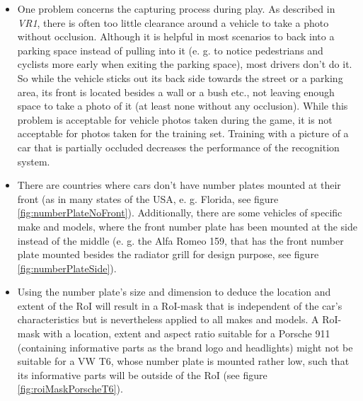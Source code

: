 \begin{itemize}
  \item One problem concerns the capturing process during play. As described in \emph{VR1}, there is often too little clearance around a vehicle to take a photo without occlusion. Although it is helpful in most scenarios to back into a parking space instead of pulling into it (e. g. to notice pedestrians and cyclists more early when exiting the parking space), most drivers don't do it. So while the vehicle sticks out its back side towards the street or a parking area, its front is located besides a wall or a bush etc., not leaving enough space to take a photo of it (at least none without any occlusion). While this problem is acceptable for vehicle photos taken during the game, it is not acceptable for photos taken for the training set. Training with a picture of a car that is partially occluded decreases the performance of the recognition system.
  \item There are countries where cars don't have number plates mounted at their front (as in many states of the USA, e. g. Florida, see figure \ref{fig:numberPlateNoFront}). Additionally, there are some vehicles of specific make and models, where the front number plate has been mounted at the side instead of the middle (e. g. the Alfa Romeo 159, that has the front number plate mounted besides the radiator grill for design purpose, see figure \ref{fig:numberPlateSide}).
  \item Using the number plate's size and dimension to deduce the location and extent of the RoI will result in a RoI-mask that is independent of the car's characteristics but is nevertheless applied to all makes and models. A RoI-mask with a location, extent and aspect ratio suitable for a Porsche 911 (containing informative parts as the brand logo and headlights) might not be suitable for a VW T6, whose number plate is mounted rather low, such that its informative parts will be outside of the RoI (see figure \ref{fig:roiMaskPorscheT6}).
\end{itemize}

